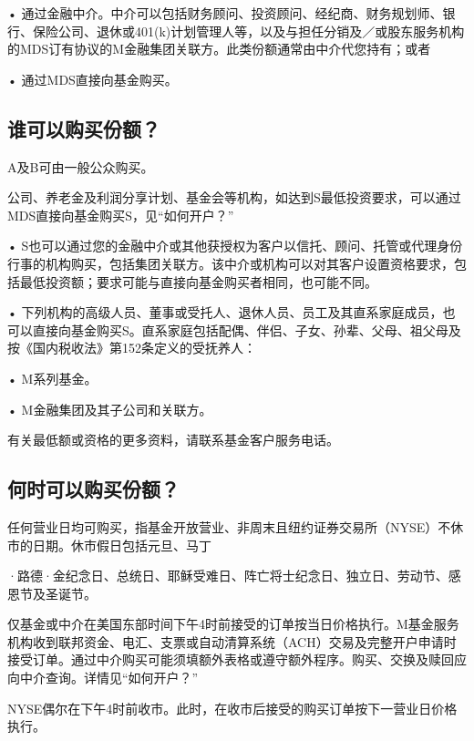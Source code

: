 \documentclass[UTF8,fontset=none,11pt,a4paper]{ctexart}
\begin{document}
\noindent • 通过金融中介。中介可以包括财务顾问、投资顾问、经纪商、财务规划师、银行、保险公司、退休或401(k)计划管理人等，以及与担任分销及／或股东服务机构的MDS订有协议的M金融集团关联方。此类份额通常由中介代您持有；或者\par\smallskip
\noindent • 通过MDS直接向\allowbreak\mbox{基金购买。}\par\smallskip
\subsection*{谁可以购买份额？}
A及B可由一般\allowbreak\mbox{公众购买。}

公司、养老金及利润分享计划、基金会等机构，如达到S最低投资要求，可以通过MDS直接向基金购买S，见“\allowbreak\mbox{如何开户？”}

\noindent • S也可以通过您的金融中介或其他获授权为客户以信托、顾问、托管或代理身份行事的机构购买，包括集团关联方。该中介或机构可以对其客户设置资格要求，包括最低投资额；要求可能与直接向基金购买者相同，也\allowbreak\mbox{可能不同。}\par\smallskip
\noindent • 下列机构的高级人员、董事或受托人、退休人员、员工及其直系家庭成员，也可以直接向基金购买S。直系家庭包括配偶、伴侣、子女、孙辈、父母、祖父母及按《国内税收法》第152条定义的\allowbreak\mbox{受抚养人：}\par\smallskip
\noindent • M\allowbreak\mbox{系列基金。}\par\smallskip
\noindent • M金融集团及其子公司\allowbreak\mbox{和关联方。}\par\smallskip
有关最低额或资格的更多资料，请联系基金客户服\allowbreak\mbox{务电话。}

\subsection*{何时可以购买份额？}
任何营业日均可购买，指基金开放营业、非周末且纽约证券交易所（NYSE）不休市的日期。休市假日包括元旦、马丁

·路德·金纪念日、总统日、耶稣受难日、阵亡将士纪念日、独立日、劳动节、感恩节\allowbreak\mbox{及圣诞节。}

仅基金或中介在美国东部时间下午4时前接受的订单按当日价格执行。M基金服务机构收到联邦资金、电汇、支票或自动清算系统（ACH）交易及完整开户申请时接受订单。通过中介购买可能须填额外表格或遵守额外程序。购买、交换及赎回应向中介查询。详情见“\allowbreak\mbox{如何开户？”}

NYSE偶尔在下午4时前收市。此时，在收市后接受的购买订单按下一营业日\allowbreak\mbox{价格执行。}
\end{document}
